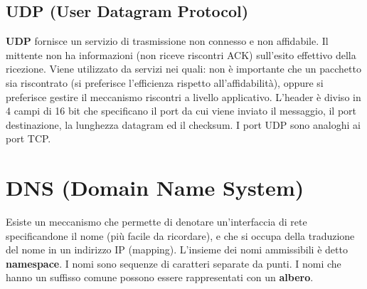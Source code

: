 \documentclass{article}
\begin{document}
\subsection{UDP (User Datagram Protocol)}
\textbf{UDP} fornisce un servizio di trasmissione non connesso e non affidabile. Il mittente non ha informazioni (non riceve riscontri ACK) sull'esito effettivo della ricezione. Viene utilizzato da servizi nei quali: non è importante che un pacchetto sia riscontrato (si preferisce l'efficienza rispetto all'affidabilità), oppure si preferisce gestire il meccanismo riscontri a livello applicativo. L'header è diviso in 4 campi di 16 bit che specificano il port da cui viene inviato il messaggio, il port destinazione, la lunghezza datagram ed il checksum. I port UDP sono analoghi ai port TCP.
\section{DNS (Domain Name System)}
Esiste un meccanismo che permette di denotare un'interfaccia di rete specificandone il nome (più facile da ricordare), e che si occupa della traduzione del nome in un indirizzo IP (mapping). L'insieme dei nomi ammissibili è detto \textbf{namespace}. I nomi sono sequenze di caratteri separate da punti. I nomi che hanno un suffisso comune possono essere rappresentati con un \textbf{albero}.
\end{document}
